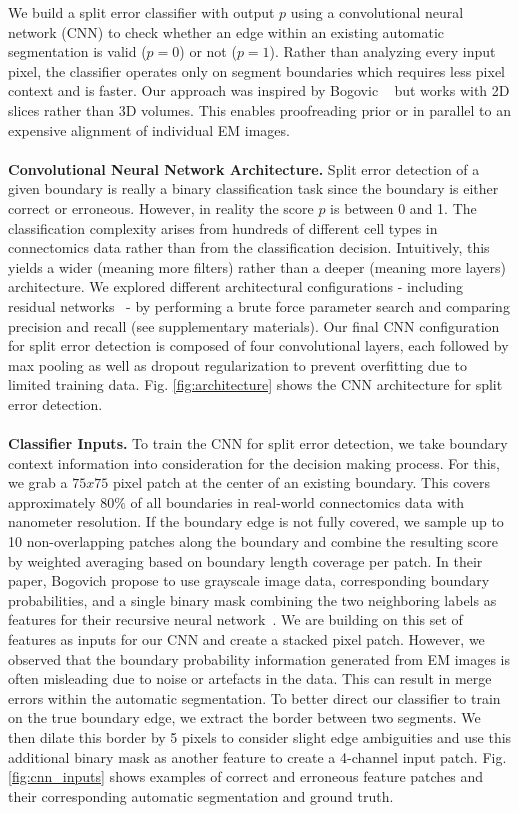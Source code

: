We build a split error classifier with output $p$ using a convolutional neural network (CNN) to check whether an edge within an existing automatic segmentation is valid ($p=0$) or not ($p=1$). Rather than analyzing every input pixel, the classifier operates only on segment boundaries which requires less pixel context and is faster. Our approach was inspired by Bogovic \etal~\cite{BogovicHJ13} but works with 2D slices rather than 3D volumes. This enables proofreading prior or in parallel to an expensive alignment of individual EM images.
\\~\\
\textbf{Convolutional Neural Network Architecture.} Split error detection of a given boundary is really a binary classification task since the boundary is either correct or erroneous. However, in reality the score $p$ is between 0 and 1. The classification complexity arises from hundreds of different cell types in connectomics data rather than from the classification decision. Intuitively, this yields a wider (meaning more filters) rather than a deeper (meaning more layers) architecture. We explored different architectural configurations - including residual networks~\cite{resnet} - by performing a brute force parameter search and comparing precision and recall (see supplementary materials). Our final CNN configuration for split error detection is composed of four convolutional layers, each followed by max pooling as well as dropout regularization to prevent overfitting due to limited training data. Fig. \ref{fig:architecture} shows the CNN architecture for split error detection.
\\~\\
\textbf{Classifier Inputs.} To train the CNN for split error detection, we take boundary context information into consideration for the decision making process. For this, we grab a $75x75$ pixel patch at the center of an existing boundary. This covers approximately $80\%$ of all boundaries in real-world connectomics data with nanometer resolution. If the boundary edge is not fully covered, we sample up to 10 non-overlapping patches along the boundary and combine the resulting score by weighted averaging based on boundary length coverage per patch. In their paper, Bogovich \etal propose to use grayscale image data, corresponding boundary probabilities, and  a single binary mask combining the two neighboring labels as features for their recursive neural network~\cite{BogovicHJ13}. We are building on this set of features as inputs for our CNN and create a stacked pixel patch. However, we observed that the boundary probability information generated from EM images is often misleading due to noise or artefacts in the data. This can result in merge errors within the automatic segmentation. To better direct our classifier to train on the true boundary edge, we extract the border between two segments. We then dilate this border by 5 pixels to consider slight edge ambiguities and use this additional binary mask as another feature to create a 4-channel input patch. Fig. \ref{fig:cnn_inputs} shows examples of correct and erroneous feature patches and their corresponding automatic segmentation and ground truth. 

